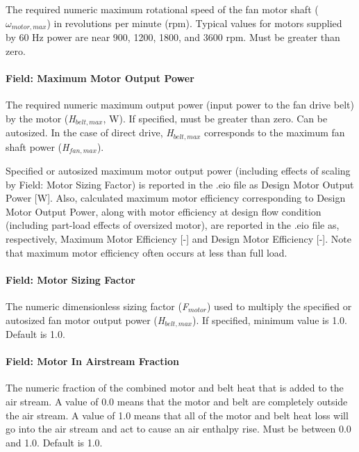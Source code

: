 The required numeric maximum rotational speed of the fan motor shaft (\(\omega_{motor,max}\)) in revolutions per minute (rpm). Typical values for motors supplied by 60 Hz power are near 900, 1200, 1800, and 3600 rpm. Must be greater than zero.

\paragraph{Field: Maximum Motor Output Power}\label{field-maximum-motor-output-power}

The required numeric maximum output power (input power to the fan drive belt) by the motor (\emph{H\(_{belt,max}\)}, W). If specified, must be greater than zero. Can be autosized. In the case of direct drive, \emph{H\(_{belt,max}\)} corresponds to the maximum fan shaft power (\emph{H\(_{fan,max}\)}).

Specified or autosized maximum motor output power (including effects of scaling by Field: Motor Sizing Factor) is reported in the .eio file as Design Motor Output Power {[}W{]}. Also, calculated maximum motor efficiency corresponding to Design Motor Output Power, along with motor efficiency at design flow condition (including part-load effects of oversized motor), are reported in the .eio file as, respectively, Maximum Motor Efficiency {[}-{]} and Design Motor Efficiency {[}-{]}. Note that maximum motor efficiency often occurs at less than full load.

\paragraph{Field: Motor Sizing Factor}\label{field-motor-sizing-factor}

The numeric dimensionless sizing factor (\emph{F\(_{motor}\)}) used to multiply the specified or autosized fan motor output power (\emph{H\(_{belt,max}\)}). If specified, minimum value is 1.0. Default is 1.0.

\paragraph{Field: Motor In Airstream Fraction}\label{field-motor-in-airstream-fraction-4}

The numeric fraction of the combined motor and belt heat that is added to the air stream. A value of 0.0 means that the motor and belt are completely outside the air stream. A value of 1.0 means that all of the motor and belt heat loss will go into the air stream and act to cause an air enthalpy rise. Must be between 0.0 and 1.0. Default is 1.0.

